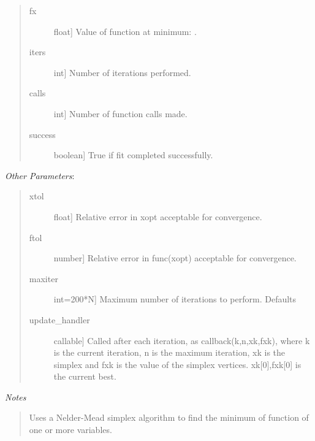 \documentclass[letterpaper,10pt,english]{sphinxmanual}
\begin{document}
\begin{fulllineitems}
\begin{quote}
\begin{description}
\item[{fx}] \leavevmode{[}float{]}
Value of function at minimum: .

\item[{iters}] \leavevmode{[}int{]}
Number of iterations performed.

\item[{calls}] \leavevmode{[}int{]}
Number of function calls made.

\item[{success}] \leavevmode{[}boolean{]}
True if fit completed successfully.

\end{description}
\end{quote}

\emph{Other Parameters}:
\begin{quote}
\begin{description}
\item[{xtol}] \leavevmode{[}float{]}
Relative error in xopt acceptable for convergence.

\item[{ftol}] \leavevmode{[}number{]}
Relative error in func(xopt) acceptable for convergence.

\item[{maxiter}] \leavevmode{[}int=200*N{]}
Maximum number of iterations to perform.  Defaults

\item[{update\_handler}] \leavevmode{[}callable{]}
Called after each iteration, as callback(k,n,xk,fxk),
where k is the current iteration, n is the maximum
iteration, xk is the simplex and fxk is the value of
the simplex vertices.  xk{[}0{]},fxk{[}0{]} is the current best.

\end{description}
\end{quote}

\emph{Notes}
\begin{quote}

Uses a Nelder-Mead simplex algorithm to find the minimum of
function of one or more variables.
\end{quote}

\end{fulllineitems}
\end{document}
